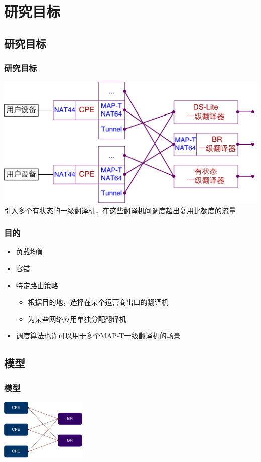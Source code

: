 \documentclass{beamer}
\begin{document}
\section{研究目标}
\subsection{研究目标}
\begin{frame}
  \frametitle{研究目标}

  \includegraphics[width=\textwidth]{figs/MAP-T-Multiple-DS-Lite.pdf}  
  \vspace{1.5em}
  引入多个有状态的一级翻译机，在这些翻译机间调度超出复用比额度的流量
\end{frame}

\begin{frame}
  \frametitle{目的}
  \begin{itemize}
  \item 负载均衡
  \item 容错
  \item 特定路由策略
    \begin{itemize}
    \item 根据目的地，选择在某个运营商出口的翻译机
    \item 为某些网络应用单独分配翻译机
    \end{itemize}
  \item 调度算法也许可以用于多个MAP-T一级翻译机的场景
  \end{itemize}
\end{frame}

\subsection{模型}
\begin{frame}
  \frametitle{模型}
  \includegraphics[height=8em]{figs/CPEs-BRs.pdf}  
\end{frame}
\end{document}
